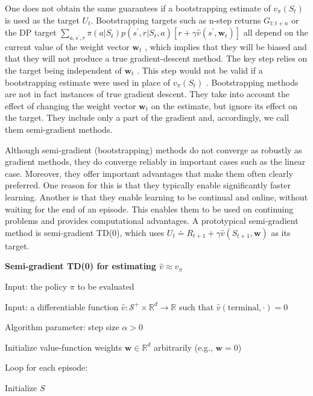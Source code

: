 \documentclass{article}
\begin{document}
One does not obtain the same guarantees if a bootstrapping estimate of $v _ { \pi } ( S _ { t } )$ is used as the target $U _ { t }$. Bootstrapping targets such as n-step returns 
$G _ { t : t + n }$ or the DP target $\textstyle \sum _ { a , s ^ { \prime } , r } \pi ( a | S _ { t } ) p ( s ^ { \prime } , r | S _ { t } , a ) [ r + \gamma \hat { v } ( s ^ { \prime } \mathbf { , } \mathbf { w } _ { t } ) ]$ 
all depend on the current value of the weight vector $\mathbf { w } _ { t }$ , which implies that they will be biased and that they will not produce a true gradient-descent method. The key step relies on the target being independent of $\mathbf { w } _ { t }$ . 
This step would not be valid if a bootstrapping estimate were used in place of $v _ { \pi } ( S _ { t } )$ . Bootstrapping methods are not in fact instances of true gradient descent. They take into account the effect of changing the weight vector $\mathbf { w } _ { t }$ on the estimate, 
but ignore its effect on the target. They include only a part of the gradient and, accordingly, we call them semi-gradient methods.

Although semi-gradient (bootstrapping) methods do not converge as robustly as gradient methods, they do converge reliably in important cases such as the linear case. Moreover, 
they offer important advantages that make them often clearly preferred. One reason for this is that they typically enable significantly faster learning. Another is that they enable learning to
be continual and online, without waiting for the end of an episode. This enables them to be used on continuing problems and provides computational advantages. A prototypical semi-gradient method is semi-gradient TD(0), 
which uses $U _ { t } \doteq R _ { t + 1 } + \gamma \hat { v } ( S _ { t + 1 } , \mathbf { w } )$ as its target.

\textbf{Semi-gradient TD(0) for estimating $\hat { v } \approx v _ { \pi }$}

Input: the policy $\pi$ to be evaluated

Input: a differentiable function $\hat { v } : \mathcal { S } ^ { + } \times \mathbb { R } ^ { d } \to \mathbb { R }$ such that $ \hat { v } ( \text{terminal}, \cdot ) = 0 $

Algorithm parameter: step size $\alpha > 0$

Initialize value-function weights $\mathbf { w } \in \mathbb { R } ^ { d }$ arbitrarily (e.g., $\mathbf{w} = 0$)

Loop for each episode:

\hspace{.5cm} Initialize $S$
\end{document}
